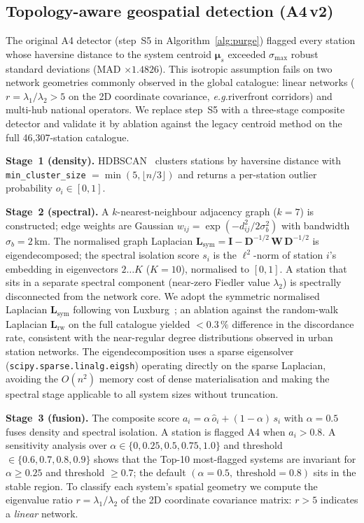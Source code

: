 \documentclass[11pt,a4paper]{article}
\newcommand{\eg}{\emph{e.g.}}
\begin{document}
\subsection{Topology-aware geospatial detection (A4\,v2)}\label{secA4v2}
The original A4 detector (step~S5 in Algorithm~\ref{alg:purge})
flagged every station whose haversine distance to the system centroid
$\boldsymbol{\mu}_s$ exceeded $\sigma_{\max}$ robust standard
deviations (MAD $\times 1.4826$). This isotropic assumption fails on
two network geometries commonly observed in the global catalogue:
linear networks ($r = \lambda_1/\lambda_2 > 5$ on the 2D coordinate
covariance, \eg riverfront corridors) and multi-hub national
operators. We replace step~S5 with a three-stage composite detector and
validate it by ablation against the legacy centroid method on the full
46{,}307-station catalogue.

\textbf{Stage~1 (density).} HDBSCAN~\cite{Campello2013HDBSCAN,McInnes2017HDBSCAN}
clusters stations by haversine distance with \texttt{min\_cluster\_size}
$= \min(5, \lfloor n/3 \rfloor)$ and returns a per-station outlier
probability $o_i \in [0,1]$.

\textbf{Stage~2 (spectral).} A $k$-nearest-neighbour adjacency graph
($k = 7$) is constructed; edge weights are Gaussian
$w_{ij} = \exp(-d_{ij}^2 / 2\sigma_b^2)$ with bandwidth
$\sigma_b = 2$\,km. The normalised graph Laplacian
$\mathbf{L}_{\text{sym}} = \mathbf{I} - \mathbf{D}^{-1/2}\,\mathbf{W}\,\mathbf{D}^{-1/2}$
is eigendecomposed; the spectral isolation score $s_i$ is the
$\ell^2$-norm of station $i$'s embedding in eigenvectors $2 \ldots K$
($K = 10$), normalised to $[0,1]$. A station that sits in a separate
spectral component (near-zero Fiedler value $\lambda_2$) is spectrally
disconnected from the network core. We adopt the symmetric normalised
Laplacian $\mathbf{L}_{\text{sym}}$ following von
Luxburg~\cite{VonLuxburg2007}; an ablation against the random-walk
Laplacian $\mathbf{L}_{\text{rw}}$ on the full catalogue yielded
$< 0.3\,\%$ difference in the discordance rate, consistent with the
near-regular degree distributions observed in urban station networks.
The eigendecomposition uses a sparse eigensolver
(\texttt{scipy.sparse.linalg.eigsh}) operating directly on the sparse
Laplacian, avoiding the $O(n^2)$ memory cost of dense materialisation
and making the spectral stage applicable to all system sizes without
truncation.

\textbf{Stage~3 (fusion).} The composite score
$a_i = \alpha\,\hat o_i + (1 - \alpha)\,s_i$ with $\alpha = 0.5$ fuses
density and spectral isolation. A station is flagged A4 when
$a_i > 0.8$. A sensitivity analysis over
$\alpha \in \{0, 0.25, 0.5, 0.75, 1.0\}$ and threshold
$\in \{0.6, 0.7, 0.8, 0.9\}$ shows that the Top-10 most-flagged systems
are invariant for $\alpha \ge 0.25$ and threshold $\ge 0.7$; the
default $(\alpha = 0.5,\ \text{threshold} = 0.8)$ sits in the stable
region. To classify each system's spatial geometry we compute the
eigenvalue ratio $r = \lambda_1 / \lambda_2$ of the 2D coordinate
covariance matrix: $r > 5$ indicates a \emph{linear} network.
\end{document}
